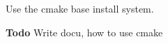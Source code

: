 Use the cmake base install system.

\begin{Desc}
\item[{\bf Todo}]Write docu, how to use cmake\end{Desc}
